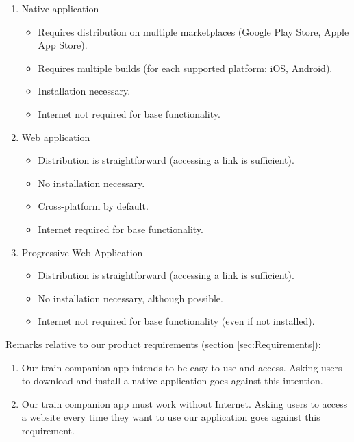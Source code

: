 \begin{enumerate}
    \item Native application
          \begin{itemize}
              \item Requires distribution on multiple marketplaces (Google Play Store, Apple App Store).
              \item Requires multiple builds (for each supported platform: iOS, Android).
              \item Installation necessary.
              \item Internet not required for base functionality.
          \end{itemize}
    \item Web application
          \begin{itemize}
              \item Distribution is straightforward (accessing a link is sufficient).
              \item No installation necessary.
              \item Cross-platform by default.
              \item Internet required for base functionality.
          \end{itemize}
    \item Progressive Web Application
          \begin{itemize}
              \item Distribution is straightforward (accessing a link is sufficient).
              \item No installation necessary, although possible.
              \item Internet not required for base functionality (even if not installed).
          \end{itemize}
\end{enumerate}

Remarks relative to our product requirements (section \ref{sec:Requirements}):
\begin{enumerate}
    \item Our train companion app intends to be easy to use and access. Asking users to download and install a native application goes against this intention.
    \item Our train companion app must work without Internet. Asking users to access a website every time they want to use our application goes against this requirement.
\end{enumerate}

